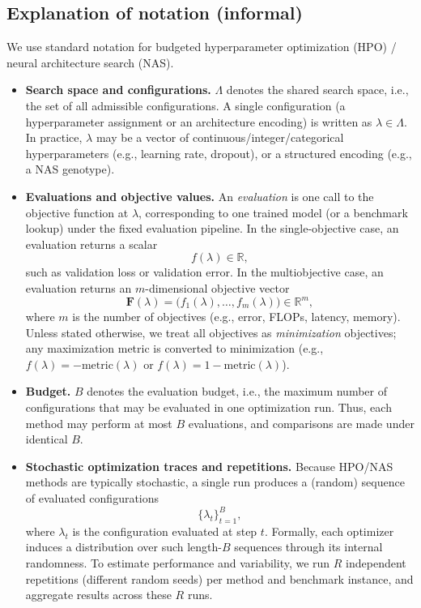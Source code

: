 \subsection*{Explanation of notation (informal)}
We use standard notation for budgeted hyperparameter optimization (HPO) / neural architecture search (NAS).

\begin{itemize}
    \item \textbf{Search space and configurations.}
    \(\Lambda\) denotes the shared search space, i.e., the set of all admissible configurations.
    A single configuration (a hyperparameter assignment or an architecture encoding) is written as \(\lambda \in \Lambda\).
    In practice, \(\lambda\) may be a vector of continuous/integer/categorical hyperparameters (e.g., learning rate, dropout),
    or a structured encoding (e.g., a NAS genotype).

    \item \textbf{Evaluations and objective values.}
    An \emph{evaluation} is one call to the objective function at \(\lambda\), corresponding to one trained model
    (or a benchmark lookup) under the fixed evaluation pipeline.
    In the single-objective case, an evaluation returns a scalar
    \[
        f(\lambda) \in \mathbb{R},
    \]
    such as validation loss or validation error.
    In the multiobjective case, an evaluation returns an \(m\)-dimensional objective vector
    \[
        \mathbf{F}(\lambda) = \big(f_1(\lambda),\ldots,f_m(\lambda)\big) \in \mathbb{R}^m,
    \]
    where \(m\) is the number of objectives (e.g., error, FLOPs, latency, memory).
    Unless stated otherwise, we treat all objectives as \emph{minimization} objectives; any maximization metric is converted to minimization
    (e.g., \(f(\lambda) = -\mathrm{metric}(\lambda)\) or \(f(\lambda)=1-\mathrm{metric}(\lambda)\)).

    \item \textbf{Budget.}
    \(B\) denotes the evaluation budget, i.e., the maximum number of configurations that may be evaluated in one optimization run.
    Thus, each method may perform at most \(B\) evaluations, and comparisons are made under identical \(B\).

    \item \textbf{Stochastic optimization traces and repetitions.}
    Because HPO/NAS methods are typically stochastic, a single run produces a (random) sequence of evaluated configurations
    \[
        \{\lambda_t\}_{t=1}^{B},
    \]
    where \(\lambda_t\) is the configuration evaluated at step \(t\).
    Formally, each optimizer induces a distribution over such length-\(B\) sequences through its internal randomness.
    To estimate performance and variability, we run \(R\) independent repetitions (different random seeds) per method and benchmark instance,
    and aggregate results across these \(R\) runs.
\end{itemize}
